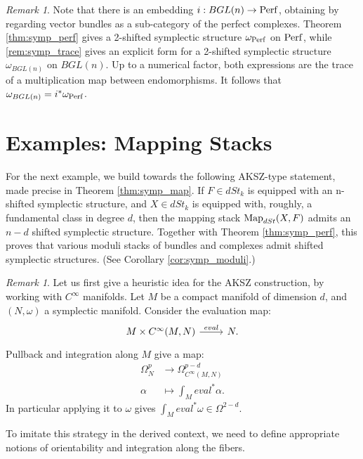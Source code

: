 \documentclass[10pt,a4paper,reqno,oneside]{book} %
\theoremstyle{plain}
\theoremstyle{definition}
\theoremstyle{remark}
\newtheorem{rem}[thm]{Remark}
\numberwithin{equation}{section}
\begin{document}
\begin{rem}
Note that there is an embedding $i: BGL(n) \to \mathrm{Perf}$, obtaining by regarding vector bundles as a sub-category of the perfect
complexes. Theorem \ref{thm:symp_perf} gives a 2-shifted symplectic structure $\omega_{\mathrm{Perf}}$ on $\mathrm{Perf}$, while 
\ref{rem:symp_trace} gives
an explicit form for a 2-shifted symplectic structure $\omega_{BGL(n)}$ on $BGL(n)$. Up to a numerical factor, both 
expressions are the trace
of a multiplication map between endomorphisms. It follows that $\omega_{BGL(n)} = i^* \omega_{\mathrm{Perf}}$.
\end{rem}



\section{Examples: Mapping Stacks}
For the next example, we build towards the following AKSZ-type statement, made precise in Theorem \ref{thm:symp_map}.
If $F \in dSt_k$ is equipped with an n-shifted symplectic structure, and $X \in dSt_k$ 
is equipped with, roughly, a fundamental class in degree $d$, then the mapping stack $\operatorname{Map}_{dSt}(X,F)$ admits an
$n-d$ shifted symplectic structure. Together with Theorem \ref{thm:symp_perf}, this proves that various moduli stacks of
bundles and complexes admit shifted symplectic structures. (See Corollary \ref{cor:symp_moduli}.)

\begin{rem}
Let us first give a heuristic idea for the AKSZ construction, by working with $C^{\infty}$ manifolds. Let $M$ be a compact
manifold of dimension $d$, and $(N,\omega)$ a symplectic manifold. Consider the evaluation map:
\[
\begin{tikzcd}
	M \times C^{\infty}(M,N) \arrow{r}{eval} & N .
\end{tikzcd}
\]
Pullback and integration along $M$ give a map:
\begin{align*}
\Omega_N^p &\to \Omega^{p-d}_{C^{\infty}(M,N)} \\
\alpha &\mapsto \int_M eval^* \alpha.
\end{align*}
In particular applying it to $\omega$ gives $\int_M eval^*\omega \in \Omega^{2-d}$. 
\end{rem}

To imitate this strategy in the derived context, we need to define appropriate notions of orientability and integration
along the fibers.
\end{document}
